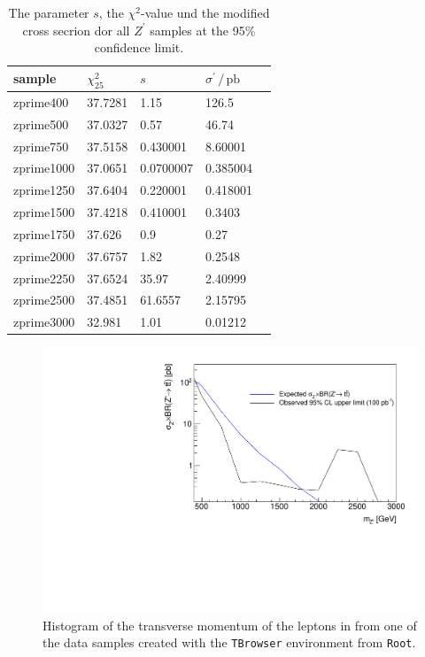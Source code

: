 \begin{table}[H]
  \centering
  \begin{tabular}{l|llll}
      sample           &  $\chi^2_{25}$  & $s$ & $\sigma^\prime \, / \, \si{\pico\barn}$ \\
      \hline
      zprime400  &   37.7281   &          1.15                      & 126.5           \\
      zprime500  &   37.0327   &          0.57                      & 46.74           \\
      zprime750  &   37.5158   &          0.430001                      & 8.60001         \\
      zprime1000 &   37.0651   &          0.0700007                      & 0.385004        \\
      zprime1250 &   37.6404   &          0.220001                      & 0.418001        \\
      zprime1500 &   37.4218   &          0.410001                      & 0.3403          \\
      zprime1750 &   37.626    &          0.9                      & 0.27            \\
      zprime2000 &   37.6757   &          1.82                      & 0.2548          \\
      zprime2250 &   37.6524   &          35.97                      & 2.40999         \\
      zprime2500 &   37.4851   &          61.6557                      & 2.15795         \\
      zprime3000 &   32.981    &          1.01                      & 0.01212         \\
      \end{tabular}
\caption{The parameter $s$, the $\chi^2$-value und the modified cross secrion dor all $Z^\prime$ samples at the 95\% confidence limit.}
\label{tab:lim}

  \end{table}




  \begin{figure}[tb]
    \centering
    \includegraphics[width=.9\textwidth]{plots/limits.pdf}
    \caption{Histogram of the transverse momentum of the leptons in from one of the data samples created with the \texttt{TBrowser} environment from \texttt{Root}.}
    \label{fig:sigm}
  \end{figure}
